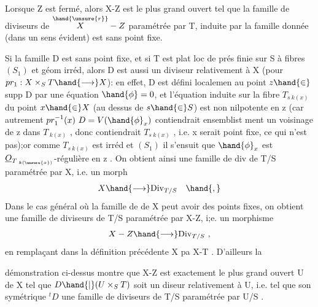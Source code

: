 
 Lorsque Z est fermé, alors X-Z est le plus grand ouvert
tel que la famille de diviseurs de $\overset{\hand{\unsure{r}}}{X}-Z$ paramétrée par T, induite par la
famille donnée (dans un sens évident) est sans point fixe.

Si la famille D est sans point fixe, et si T est plat loc de prés finie
sur S à fibres $(S_1)$ et géom irréd, alors D est aussi un diviseur 
relativement à X (pour $pr_1 : X\times_S T \hand{\longrightarrow} X$): en effet, D est défini localemen
au point $z \hand{\in}$ supp D par une équation  $\hand{\phi} = 0$, et l'équation induite sur la fibre
$T_{s\ k(x)}$ du point $x\hand{\in} X$ (au dessus de $s\hand{\in} S$) est non 
nilpotente en z (car autrement $pr_1^{-1}(x)\ D = V(\hand{\phi}_x)$  contiendrait ensemblist
ment un voisinage de z dans $T_{\ k(x)}$ , donc contiendrait $T_{s\ k(x)}$ , i.e.
x serait point fixe, ce qui n'est pas);or comme $T_{s\ k(x)}$ est irréd et $(S_1)$
il s'ensuit que $\hand{\phi}_x$ est $\underline{O}_{T_{\ k(\unsure{x})}}$-régulière en z . On obtient ainsi
 une famille de div de T/S paramétrée par X, i.e. un morph
\[ X \hand{\longrightarrow} \mathrm{Div}_{T/S} \quad \hand{,} \]
Dans le cas général où la famille de  de X peut avoir des points
fixes, on obtient une famille de diviseurs de T/S paramétrée par X-Z,
i;e. un morphisme
\[ X - Z \hand{\longrightarrow} \mathrm{Div}_{T/S} \ , \]
en remplaçant dans la définition précédente X pa X-T . D'ailleurs la






 démonstration ci-dessus montre que X-Z est exactement
le plus grand ouvert U de X tel que $D\hand{|}(U\times_S T)$ soit un diseur 
relativement à U, i.e. tel que son symétrique ${}^{t}D$  une famille de diviseurs de T/S paramétrée
par U/S .

